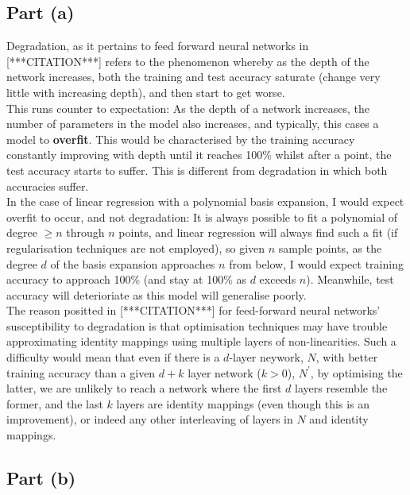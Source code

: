 \subsection{Part (a)}

Degradation, as it pertains to feed forward neural networks in [***CITATION***] refers to the phenomenon whereby as the depth of the network increases, both the training and test accuracy saturate (change very little with increasing depth), and then start to get worse.\\[1em]

This runs counter to expectation: As the depth of a network increases, the number of parameters in the model also increases, and typically, this cases a model to \textbf{overfit}. This would be characterised by the training accuracy constantly improving with depth until it reaches 100\% whilst after a point, the test accuracy starts to suffer. This is different from degradation in which both accuracies suffer.\\[1em]

In the case of linear regression with a polynomial basis expansion, I would expect overfit to occur, and not degradation: It is always possible to fit a polynomial of degree $\geq n$ through $n$ points, and linear regression will always find such a fit (if regularisation techniques are not employed), so given $n$ sample points, as the degree $d$ of the basis expansion approaches $n$ from below, I would expect training accuracy to approach 100\% (and stay at 100\% as $d$ exceeds $n$). Meanwhile, test accuracy will deterioriate as this model will generalise poorly.\\[1em]

The reason positted in [***CITATION***] for feed-forward neural networks' susceptibility to degradation is that optimisation techniques may have trouble approximating identity mappings using multiple layers of non-linearities. Such a difficulty would mean that even if there is a $d$-layer neywork, $N$, with better training accuracy than a given $d+k$ layer network ($k > 0$), $N^\prime$, by optimising the latter, we are unlikely to reach a network where the first $d$ layers resemble the former, and the last $k$ layers are identity mappings (even though this is an improvement), or indeed any other interleaving of layers in $N$ and identity mappings.

\subsection{Part (b)}

